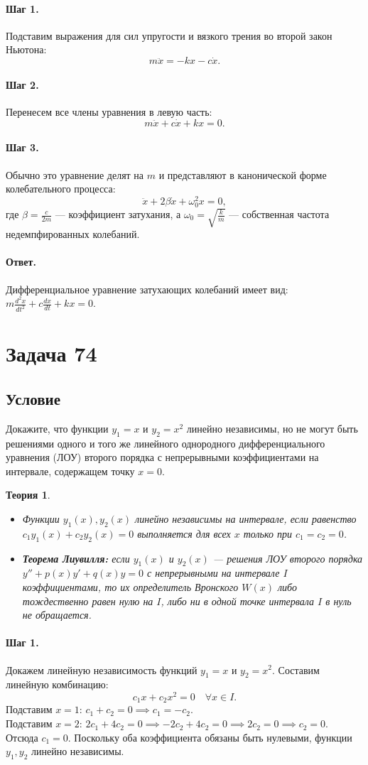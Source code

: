 \documentclass[12pt,a4paper]{article}
\theoremstyle{solution}
\newtheorem*{theory}{Теория}
\newcommand{\task}[1]{\newpage\section*{Задача #1}}
\newcommand{\answer}{\paragraph{Ответ.}}
\newcommand{\step}[1]{\paragraph{Шаг #1.}}
\begin{document}
\step{1} Подставим выражения для сил упругости и вязкого трения во второй закон Ньютона:
\[
m \ddot{x} = -kx - c\dot{x}.
\]

\step{2} Перенесем все члены уравнения в левую часть:
\[
m \ddot{x} + c\dot{x} + kx = 0.
\]

\step{3} Обычно это уравнение делят на $m$ и представляют в канонической форме колебательного процесса:
\[
\ddot{x} + 2\beta \dot{x} + \omega_0^2 x = 0,
\]
где $\beta = \frac{c}{2m}$ — коэффициент затухания, а $\omega_0 = \sqrt{\frac{k}{m}}$ — собственная частота недемпфированных колебаний.

\answer
Дифференциальное уравнение затухающих колебаний имеет вид: $m \frac{d^2 x}{dt^2} + c \frac{dx}{dt} + kx = 0$.

\task{74}
\subsection*{Условие}
Докажите, что функции $y_1 = x$ и $y_2 = x^2$ линейно независимы, но не могут быть решениями одного и того же линейного однородного дифференциального уравнения (ЛОУ) второго порядка с непрерывными коэффициентами на интервале, содержащем точку $x = 0$.

\begin{theory}
\begin{itemize}
    \item Функции $y_1(x), y_2(x)$ линейно независимы на интервале, если равенство $c_1 y_1(x) + c_2 y_2(x) = 0$ выполняется для всех $x$ только при $c_1 = c_2 = 0$.
    \item \textbf{Теорема Лиувилля:} если $y_1(x)$ и $y_2(x)$ — решения ЛОУ второго порядка $y'' + p(x)y' + q(x)y = 0$ с непрерывными на интервале $I$ коэффициентами, то их определитель Вронского $W(x)$ либо тождественно равен нулю на $I$, либо ни в одной точке интервала $I$ в нуль не обращается.
\end{itemize}
\end{theory}

\step{1} Докажем линейную независимость функций $y_1 = x$ и $y_2 = x^2$. Составим линейную комбинацию:
\[
c_1 x + c_2 x^2 = 0 \quad \forall x \in I.
\]
Подставим $x = 1$: $c_1 + c_2 = 0 \implies c_1 = -c_2$. \\
Подставим $x = 2$: $2c_1 + 4c_2 = 0 \implies -2c_2 + 4c_2 = 0 \implies 2c_2 = 0 \implies c_2 = 0$. \\
Отсюда $c_1 = 0$. Поскольку оба коэффициента обязаны быть нулевыми, функции $y_1, y_2$ линейно независимы.
\end{document}
